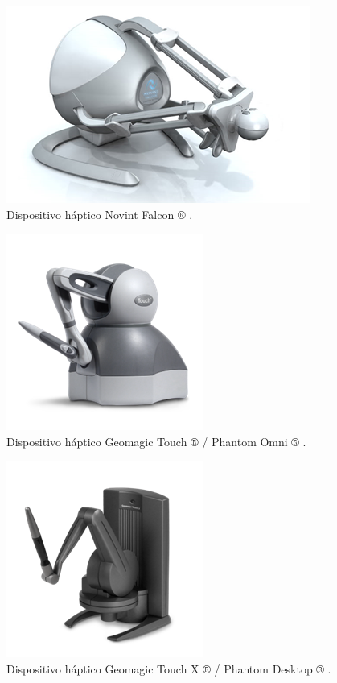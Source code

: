 \begin{figure}[ht!]
    \centering
    \includegraphics[width=0.4\linewidth]{capitulos/figuras/hapticoNovintFalcon.png}
    \caption{Dispositivo háptico Novint Falcon ® \cite{HAPTICSHOUSE2019}
    \label{fig:hapticoNovintFalcon}.}
\end{figure}

\begin{figure}[ht!]
    \centering
    \includegraphics[width=0.4\linewidth]{capitulos/figuras/hapticoTouch.png}
    \caption{Dispositivo háptico Geomagic Touch ® / Phantom Omni ® \cite{3DSystems2018}.}
    \label{fig:hapticoTouch}
\end{figure}

\begin{figure}[ht!]
    \centering
    \includegraphics[width=0.4\linewidth]{capitulos/figuras/hapticoTouchX.png}
    \caption{Dispositivo háptico Geomagic Touch X ® / Phantom Desktop ® \cite{3DSystems2018}.}
    \label{fig:hapticoTouchX}
\end{figure}


